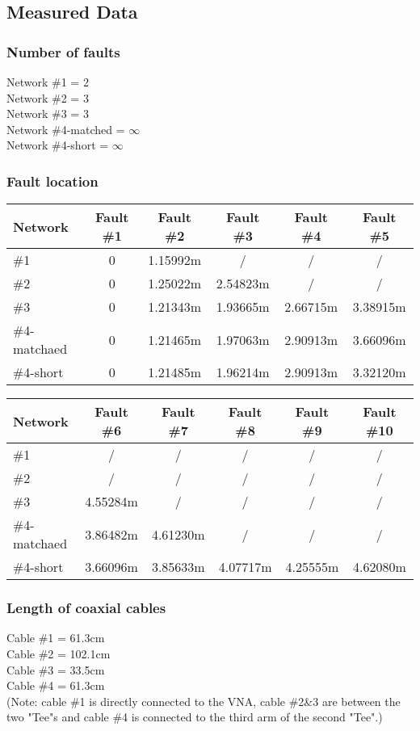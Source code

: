 \documentclass[11pt,oneside,a4paper]{report}
\begin{document}
\subsection*{Measured Data}
\subsubsection*{Number of faults}
Network \#1 = 2\\
Network \#2 = 3\\
Network \#3 = 3\\
Network \#4-matched = \(\infty\)\\
Network \#4-short = \(\infty\)
\subsubsection*{Fault location}
\begin{table}[htbp]
\begin{tabular}{lccccc}
\toprule
Network & Fault \#1 & Fault \#2 & Fault \#3 & Fault \#4 & Fault \#5 \\
\midrule
\#1 & 0 & 1.15992m & / & / & / \\
\#2 & 0 & 1.25022m & 2.54823m & / & / \\
\#3 & 0 & 1.21343m & 1.93665m & 2.66715m & 3.38915m \\
\#4-matchaed & 0 & 1.21465m & 1.97063m & 2.90913m & 3.66096m \\
\#4-short & 0 & 1.21485m & 1.96214m & 2.90913m & 3.32120m \\
\bottomrule
\end{tabular}
\end{table}

\begin{table}[htbp]
\begin{tabular}{lccccc}
\toprule
Network & Fault \#6 & Fault \#7 & Fault \#8 & Fault \#9 & Fault \#10 \\
\midrule
\#1 & / & / & / & / & / \\
\#2 & / & / & / & / & / \\
\#3 & 4.55284m & / & / & / & / \\
\#4-matchaed & 3.86482m & 4.61230m & / & / & / \\
\#4-short & 3.66096m & 3.85633m & 4.07717m & 4.25555m & 4.62080m \\
\bottomrule
\end{tabular}
\end{table}

\subsubsection{Length of coaxial cables}
Cable \#1 = 61.3cm\\
Cable \#2 = 102.1cm\\
Cable \#3 = 33.5cm\\
Cable \#4 = 61.3cm\\
(Note: cable \#1 is directly connected to the VNA, cable \#2&3 are between the two "Tee"s and cable \#4 is connected to the third arm of the second "Tee".)
\end{document}
